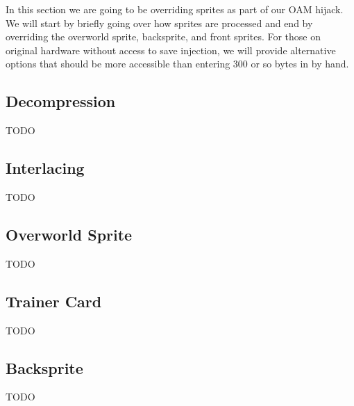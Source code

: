 \documentclass[../main.tex]{subfiles}
\begin{document}
    In this section we are going to be overriding sprites as part of our OAM hijack.  We will start by briefly going over how sprites are processed and end by overriding the overworld sprite, backsprite, and front sprites.  For those on original hardware without access to save injection, we will provide alternative options that should be more accessible than entering 300 or so bytes in by hand.

    \subsection{Decompression}
    TODO

    \subsection{Interlacing}
    TODO

    \subsection{Overworld Sprite}
    TODO

    \subsection{Trainer Card}
    TODO

    \subsection{Backsprite}
    TODO
\end{document}
